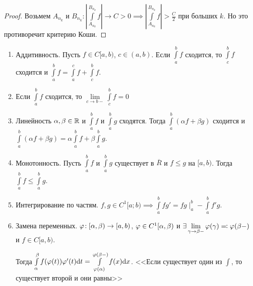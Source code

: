 \begin{proof}
    Возьмем $A_{n_k}$ и  $B_{n_k}\!: |\int\limits_{A_{n_k}}^{B_{n_k}} f| \to C > 0 \implies |\int\limits_{A_{n_k}}^{B_{n_k}} f| > \frac{C}{2}$ при больших $k$. Но это противоречит критерию Коши.
\end{proof}
\begin{properties}
    \begin{enumerate}
        \item Аддитивность. Пусть $f \in C[a, b)$,  $c \in (a, b)$. Если  $\int\limits_a^b f$ сходится, то  $\int\limits_c^b f$ сходится и  $\int\limits_a^b f = \int\limits_a^c f + \int\limits_c^b f$.
        \item Если $\int\limits_a^b f$ сходится, то  $\lim\limits_{c \to b-} \int\limits_c^b f = 0$
        \item Линейность $\alpha, \beta \in \mathbb{R}$ и $\int\limits_a^b f$ и  $\int\limits_a^b g$ сходятся. Тогда  $\int\limits_a^b(\alpha f + \beta g)$ сходится и $\int\limits_a^b (\alpha f + \beta g) = \alpha \int\limits_a^b f + \beta\int\limits_a^b g$.
        \item Монотонность. Пусть $\int\limits_a^b f$ и $\int\limits_a^b g$ существует в  $\overline{R}$ и  $f \le g$ на $[a, b)$. Тогда  $\int\limits_a^b f \le \int\limits_a^b g$.
        \item Интегрирование по частям. $f, g \in C^1[a; b) \implies \int\limits_a^b fg' = fg \mid_a^b - \int\limits_a^b f'g$.
        \item Замена переменных. $\varphi\!: [\alpha, \beta) \to [a, b)$,  $\varphi \in C^1[\alpha, \beta)$ и $\exists \lim\limits_{\gamma \to \beta-} \varphi(\gamma) \eqqcolon \varphi(\beta-)$ и $f \in C[a, b)$.

            Тогда  $\int\limits_\alpha^\beta f(\varphi(t)) \varphi'(t)\mathrm{d}t = \int\limits_{\varphi(\alpha)}^{\varphi(\beta-)} f(x) \mathrm{d}x$. <<Если существует один из  $\int$, то существует второй и они равны>>
    \end{enumerate}
\end{properties}
